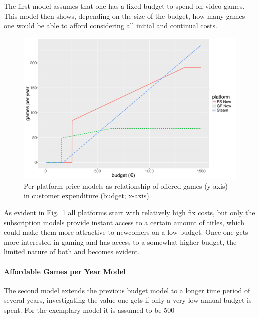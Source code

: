 The first model assumes that one has a fixed budget to spend on video games. This model then shows, depending on the size of the budget, how many games one would be able to afford considering all initial and continual costs.

\begin{figure}[!t]
	\centering
	\includegraphics[width=1.0\columnwidth]{images/gamesperyear-over-budget.pdf}
	\caption{Per-platform price models as relationship of offered games (y-axis) in customer expenditure (budget; x-axis).}
\label{fig:gamesperyear-over-budget}
\end{figure}

As evident in Fig.~\ref{fig:gamesperyear-over-budget} all platforms start with relatively high fix costs, but only the subscription models provide instant access to a certain amount of titles, which could make them more attractive to newcomers on a low budget. Once one gets more interested in gaming and has access to a somewhat higher budget, the limited nature of both \psnow and \gfnow becomes evident.


\paragraph{Affordable Games per Year Model}

The second model extends the previous budget model to a longer time period of several years, investigating the value one gets if only a very low annual budget is spent. For the exemplary model it is assumed to be \SI{500}{\EUR}

